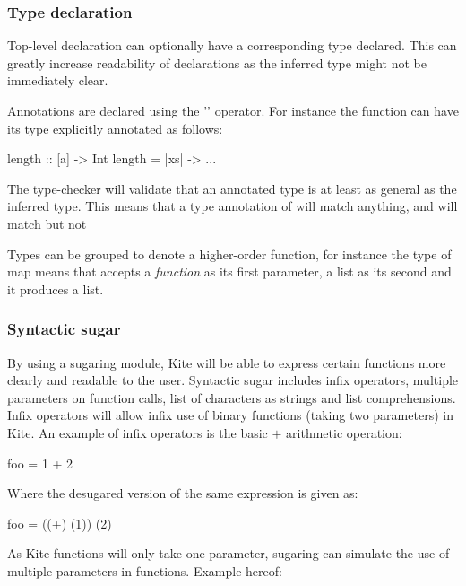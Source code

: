 \subsubsection{Type declaration}

Top-level declaration can optionally have a corresponding type declared. This can greatly increase readability of declarations as the inferred type might not be immediately clear.

Annotations are declared using the '\code{::}' operator. For instance the function  can have its type explicitly annotated as follows:

\begin{kite}
length :: [a] -> Int
length = |xs| -> {
  ...
}
\end{kite}

The type-checker will validate that an annotated type is at least as general as the inferred type. This means that a type annotation of  will match anything, and  will match  but not 

Types can be grouped to denote a higher-order function, for instance the type of map  means that  accepts a \emph{function} as its first parameter, a list as its second and it produces a list.


\subsubsection{Syntactic sugar}
\label{sec:kite-design-sugar}
By using a sugaring module, Kite will be able to express certain functions more clearly and readable to the user. Syntactic sugar includes infix operators, multiple parameters on function calls, list of characters as strings and list comprehensions. Infix operators will allow infix use of binary functions (taking two parameters) in Kite. An example of infix operators is the basic $+$ arithmetic operation:

\begin{kite}
foo = 1 + 2
\end{kite}

Where the desugared version of the same expression is given as:

\begin{kite}
foo = ((+) (1)) (2)
\end{kite}

As Kite functions will only take one parameter, sugaring can simulate the use of multiple parameters in functions. Example hereof:

